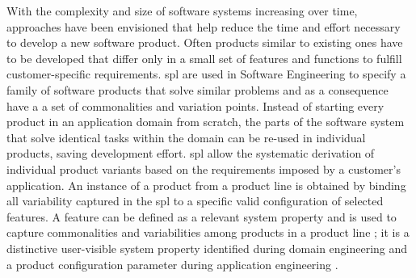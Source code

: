 With the complexity and size of software systems increasing over time, approaches have been envisioned that help reduce the time and effort necessary to develop a new software product. Often products similar to existing ones have to be developed that differ only in a small set of features and functions to fulfill customer-specific requirements.
\Gls{spl} are used in Software Engineering to specify a family of software products that solve similar problems and as a consequence have a a set of commonalities and variation points. Instead of starting every product in an application domain from scratch, the parts of the software system that solve identical tasks within the domain can be re-used in individual products, saving development effort. 
\Gls{spl} allow the systematic derivation of individual product variants based on the requirements imposed by a customer's application. 
An instance of a product from a product line is obtained by binding all variability captured in the \gls{spl} to a specific valid configuration of selected features.
A feature can be defined as a relevant system property and is used to capture commonalities and variabilities among products in a product line \cite{Fernandes2008}; it is a distinctive user-visible system property identified during domain engineering and a product configuration parameter during application engineering \cite{Saller2013}.

